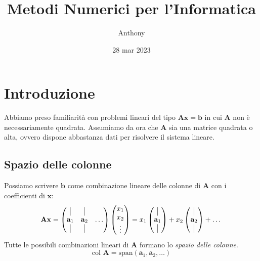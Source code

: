\documentclass{article}
\title{Metodi Numerici per l'Informatica}
\author{Anthony}
\date{28 mar 2023}
\begin{document}
    \maketitle

    \section{Introduzione}
        Abbiamo preso familiarità con problemi lineari del tipo $\mathbf{Ax} = \mathbf{b}$ in cui $\mathbf{A}$ non è necessariamente 
        quadrata. Assumiamo da ora che $\mathbf{A}$ sia una matrice quadrata o alta, ovvero dispone abbastanza dati per risolvere il 
        sistema lineare. 
        \subsection{Spazio delle colonne}
            Possiamo scrivere $\mathbf{b}$ come combinazione lineare delle colonne di $\mathbf{A}$ con i coefficienti di $\mathbf{x}$:
            \[\mathbf{Ax} = \begin{pmatrix}
                \vline & \vline & \\
                \mathbf{a}_1 & \mathbf{a}_2 & \dots \\
                \vline & \vline & \\
            \end{pmatrix} \begin{pmatrix}
                x_1 \\
                x_2 \\
                \vdots
            \end{pmatrix} = x_1 \begin{pmatrix}
                \vline \\
                \mathbf{a}_1 \\
                \vline
            \end{pmatrix} + 
            x_2 \begin{pmatrix}
                \vline \\
                \mathbf{a}_2 \\
                \vline
            \end{pmatrix} + \dots\]
            Tutte le possibili combinazioni lineari di $\mathbf{A}$ formano lo \emph{spazio delle colonne}.
            \[\text{col }\mathbf{A} = \text{span}(\mathbf{a}_1, \mathbf{a}_2, \dots)\]
\end{document}
